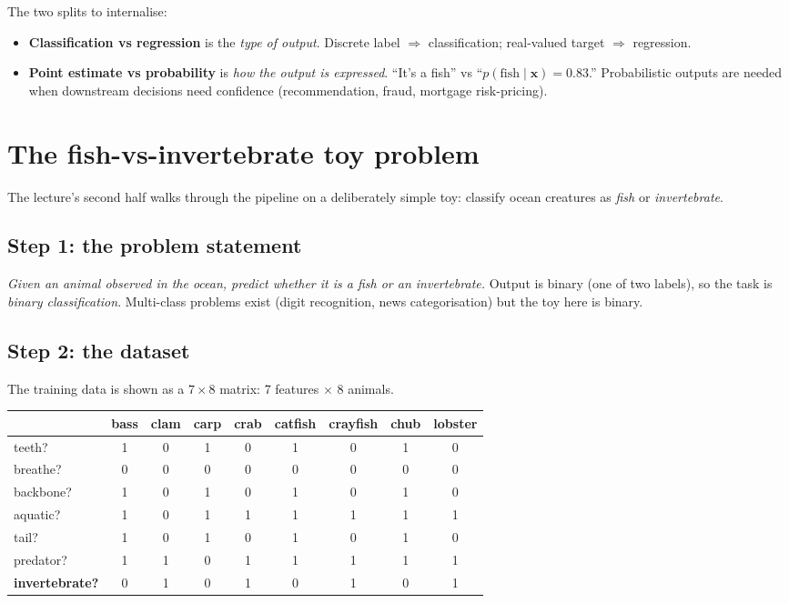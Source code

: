 \documentclass[11pt, a4paper]{article}
\begin{document}
The two splits to internalise:

\begin{itemize}
  \item \textbf{Classification vs regression} is the \emph{type of output}. Discrete label $\Rightarrow$ classification; real-valued target $\Rightarrow$ regression.
  \item \textbf{Point estimate vs probability} is \emph{how the output is expressed}. ``It's a fish'' vs ``$p(\text{fish}\mid\mathbf{x}) = 0.83$.'' Probabilistic outputs are needed when downstream decisions need confidence (recommendation, fraud, mortgage risk-pricing).
\end{itemize}

\section{The fish-vs-invertebrate toy problem}

The lecture's second half walks through the pipeline on a deliberately simple toy: classify ocean creatures as \emph{fish} or \emph{invertebrate}.

\subsection{Step 1: the problem statement}

\emph{Given an animal observed in the ocean, predict whether it is a fish or an invertebrate.} Output is binary (one of two labels), so the task is \emph{binary classification}. Multi-class problems exist (digit recognition, news categorisation) but the toy here is binary.

\subsection{Step 2: the dataset}

The training data is shown as a $7 \times 8$ matrix: 7 features $\times$ 8 animals.

\begin{center}
\small
\begin{tabular}{l cccccccc}
\toprule
& bass & clam & carp & crab & catfish & crayfish & chub & lobster \\
\midrule
teeth?    & 1 & 0 & 1 & 0 & 1 & 0 & 1 & 0 \\
breathe?  & 0 & 0 & 0 & 0 & 0 & 0 & 0 & 0 \\
backbone? & 1 & 0 & 1 & 0 & 1 & 0 & 1 & 0 \\
aquatic?  & 1 & 0 & 1 & 1 & 1 & 1 & 1 & 1 \\
tail?     & 1 & 0 & 1 & 0 & 1 & 0 & 1 & 0 \\
predator? & 1 & 1 & 0 & 1 & 1 & 1 & 1 & 1 \\
\midrule
\textbf{invertebrate?} & 0 & 1 & 0 & 1 & 0 & 1 & 0 & 1 \\
\bottomrule
\end{tabular}
\end{center}
\end{document}

